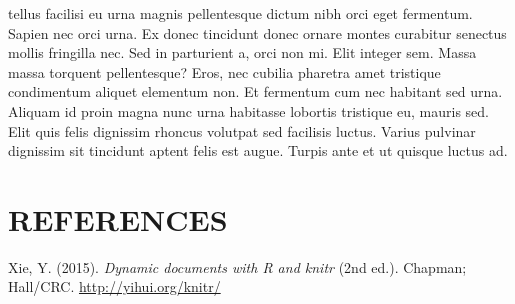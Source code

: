 \documentclass{source/tex/templates/maththesis}
\newlength{\cslhangindent}
\newenvironment{CSLReferences}[2] %
 {%
  \setlength{\parindent}{0pt}
  \ifodd #1
  \let\oldpar\par
  \def\par{\hangindent=\cslhangindent\oldpar}
  \fi
  \setlength{\parskip}{1mm}
  \setlength{\baselineskip}{6mm}
 }%
 {}
\begin{document}
tellus facilisi eu urna magnis pellentesque dictum nibh orci eget fermentum. Sapien nec orci urna. Ex donec tincidunt donec ornare montes curabitur senectus mollis fringilla nec. Sed in parturient a, orci non mi. Elit integer sem. Massa massa torquent pellentesque? Eros, nec cubilia pharetra amet tristique condimentum aliquet elementum non. Et fermentum cum nec habitant sed urna. Aliquam id proin magna nunc urna habitasse lobortis tristique eu, mauris sed. Elit quis felis dignissim rhoncus volutpat sed facilisis luctus. Varius pulvinar dignissim sit tincidunt aptent felis est augue. Turpis ante et ut quisque luctus ad.

\hypertarget{references}{%
\chapter*{REFERENCES}\label{references}}

\hypertarget{refs}{}
\begin{CSLReferences}{1}{0}
\leavevmode{}%
Xie, Y. (2015). \emph{Dynamic documents with {R} and knitr} (2nd ed.). Chapman; Hall/CRC. \url{http://yihui.org/knitr/}

\end{CSLReferences}

\end{document}
